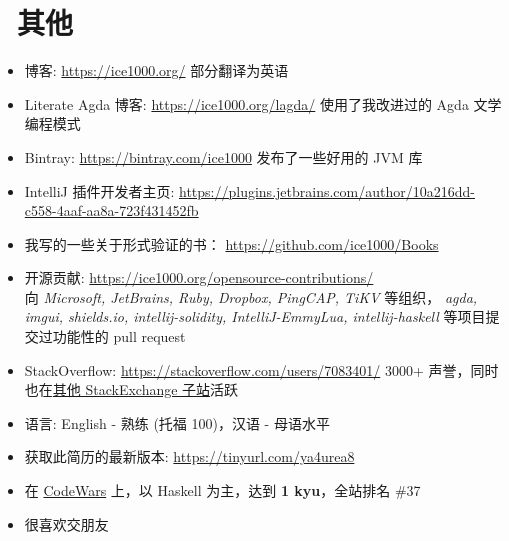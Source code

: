 \documentclass{resume}
\begin{document}
\section{\faInfo\ 其他}
\begin{itemize}[parsep=0.25ex]
  \item 博客: \url{https://ice1000.org/} 部分翻译为英语
  \item Literate Agda 博客: \url{https://ice1000.org/lagda/} 使用了我改进过的 Agda 文学编程模式
  \item Bintray: \url{https://bintray.com/ice1000} 发布了一些好用的 JVM 库
  \item IntelliJ 插件开发者主页: \url{https://plugins.jetbrains.com/author/10a216dd-c558-4aaf-aa8a-723f431452fb}
  \item 我写的一些关于形式验证的书： \url{https://github.com/ice1000/Books}
  \item 开源贡献: \url{https://ice1000.org/opensource-contributions/} \\
    向 \textit{Microsoft, JetBrains, Ruby, Dropbox, PingCAP, TiKV} 等组织，
    \textit{agda, imgui, shields.io, intellij-solidity, IntelliJ-EmmyLua,
      intellij-haskell} 等项目提交过功能性的 pull request
  \item StackOverflow: \url{https://stackoverflow.com/users/7083401/}
    3000+ 声誉，同时也在\href{https://stackexchange.com/users/9532102/} {其他 StackExchange 子站}活跃
  \item 语言: English - 熟练 (托福 100)，汉语 - 母语水平
  \item 获取此简历的最新版本: \url{https://tinyurl.com/ya4urea8}
  \item 在
    \href{https://www.codewars.com/users/ice1000} {CodeWars}
    上，以 Haskell 为主，达到 \textbf{1 kyu}，全站排名 \#37
  \item 很喜欢交朋友
\end{itemize}

%
%
\end{document}
